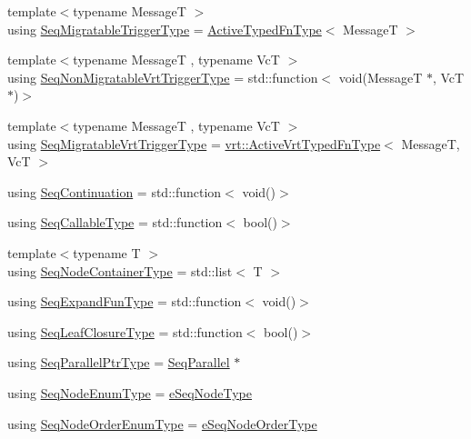 \begin{DoxyCompactItemize}
\item 
{\footnotesize template$<$typename MessageT $>$ }\\using \hyperlink{namespacevt_1_1seq_aab252d92ce46371ce1b307eeb524f030}{Seq\+Migratable\+Trigger\+Type} = \hyperlink{namespacevt_a54eefd5373739c7365058b0d22fea6e2}{Active\+Typed\+Fn\+Type}$<$ MessageT $>$
\item 
{\footnotesize template$<$typename MessageT , typename VcT $>$ }\\using \hyperlink{namespacevt_1_1seq_a73ba0745e730a1837e22d831390d92e0}{Seq\+Non\+Migratable\+Vrt\+Trigger\+Type} = std\+::function$<$ void(MessageT $\ast$, VcT $\ast$)$>$
\item 
{\footnotesize template$<$typename MessageT , typename VcT $>$ }\\using \hyperlink{namespacevt_1_1seq_a4147691d837ca54f178a5f1c49effc6f}{Seq\+Migratable\+Vrt\+Trigger\+Type} = \hyperlink{namespacevt_1_1vrt_a14077459ea3367e5834151d314ff4bc8}{vrt\+::\+Active\+Vrt\+Typed\+Fn\+Type}$<$ MessageT, VcT $>$
\item 
using \hyperlink{namespacevt_1_1seq_a81dfe143a0308c0f5bc10146c82530e6}{Seq\+Continuation} = std\+::function$<$ void()$>$
\item 
using \hyperlink{namespacevt_1_1seq_ab8c5e0c5aec2bd712a2b57e2e4553de6}{Seq\+Callable\+Type} = std\+::function$<$ bool()$>$
\item 
{\footnotesize template$<$typename T $>$ }\\using \hyperlink{namespacevt_1_1seq_ad2b106b952becc168d3c567411ebf899}{Seq\+Node\+Container\+Type} = std\+::list$<$ T $>$
\item 
using \hyperlink{namespacevt_1_1seq_ab345c700c06d135cafba39f711767ad5}{Seq\+Expand\+Fun\+Type} = std\+::function$<$ void()$>$
\item 
using \hyperlink{namespacevt_1_1seq_a13c76fb1c62795dfd2d359b2dde35e8a}{Seq\+Leaf\+Closure\+Type} = std\+::function$<$ bool()$>$
\item 
using \hyperlink{namespacevt_1_1seq_a050106112a0717f8e482465957fb2bfe}{Seq\+Parallel\+Ptr\+Type} = \hyperlink{structvt_1_1seq_1_1_seq_parallel}{Seq\+Parallel} $\ast$
\item 
using \hyperlink{namespacevt_1_1seq_a99cbd4cc79e0376ab97a7868a4de7c97}{Seq\+Node\+Enum\+Type} = \hyperlink{namespacevt_1_1seq_ae721d4e8b95cf57a7e4169db1929e0f1}{e\+Seq\+Node\+Type}
\item 
using \hyperlink{namespacevt_1_1seq_aa68ba04b78f90a392a0647636b07f572}{Seq\+Node\+Order\+Enum\+Type} = \hyperlink{namespacevt_1_1seq_a313357c71bba2bea5c57f50d69f1edf7}{e\+Seq\+Node\+Order\+Type}

\end{DoxyCompactItemize}
